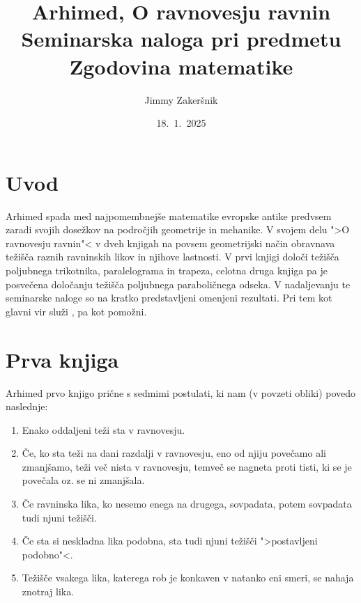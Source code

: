 \documentclass[a4paper, 10pt]{article}
\title{Arhimed, O ravnovesju ravnin\\ {\large Seminarska naloga pri predmetu Zgodovina matematike}}
\date{18.~1.~2025}
\author{Jimmy Zakeršnik}
\begin{document}
	\maketitle
	\thispagestyle{empty}
	\newpage
	\newpage
	\section{Uvod}
		Arhimed spada med najpomembnejše matematike evropske antike predvsem zaradi svojih dosežkov na področjih geometrije in mehanike. V svojem delu ">O ravnovesju ravnin"< v dveh knjigah na povsem geometrijski način obravnava težišča raznih ravninskih likov in njihove lastnosti. V prvi knjigi določi težišča poljubnega trikotnika, paralelograma in trapeza, celotna druga knjiga pa je posvečena določanju težišča poljubnega paraboličnega odseka. V nadaljevanju te seminarske naloge so na kratko predstavljeni omenjeni rezultati. Pri tem kot glavni vir služi \cite{bib:Heath}, \cite{bib:Mendell} pa kot pomožni.
	\section{Prva knjiga}
		Arhimed prvo knjigo prične s sedmimi postulati, ki nam (v povzeti obliki) povedo naslednje: \begin{enumerate}
			\item Enako oddaljeni teži sta v ravnovesju.
			\item Če, ko sta teži na dani razdalji v ravnovesju, eno od njiju povečamo ali zmanjšamo, teži več nista v ravnovesju, temveč se nagneta proti tisti, ki se je povečala oz. se ni zmanjšala.
			\item Če ravninska lika, ko nesemo enega na drugega, sovpadata, potem sovpadata tudi njuni težišči.
			\item Če sta si neskladna lika podobna, sta tudi njuni težišči ">postavljeni podobno"<. 
			\item Težišče vsakega lika, katerega rob je konkaven v natanko eni smeri, se nahaja znotraj lika.
		\end{enumerate}
		
\end{document}
